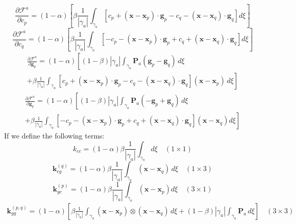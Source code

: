 \documentclass[11pt]{article} %
\begin{document}
\begin{equation}
	\frac{\partial \mathcal{F}^a}{\partial c_p} = (1-\alpha) \left[ \beta \frac{1}{| \gamma_a |} \int_{\gamma_a} \left[ c_p + (\mathbf{x} - \mathbf{x}_p) \cdot \mathbf{g}_p - c_q - (\mathbf{x} - \mathbf{x}_q) \cdot \mathbf{g}_q \right] d \xi \right]
\end{equation}
\begin{equation}
	\frac{\partial \mathcal{F}^a}{\partial c_q} = (1-\alpha) \left[ \beta \frac{1}{| \gamma_a |} \int_{\gamma_a} \left[ -c_p - (\mathbf{x} - \mathbf{x}_p) \cdot \mathbf{g}_p + c_q + (\mathbf{x} - \mathbf{x}_q) \cdot \mathbf{g}_q \right] d \xi \right]
\end{equation}
\begin{eqnarray}
	\frac{\partial \mathcal{F}^a}{\partial \mathbf{g}_p} = (1-\alpha) \left[ (1-\beta) | \gamma_a | \int_{\gamma_a} \mathbf{P}_a (\mathbf{g}_p - \mathbf{g}_q ) \, d \xi \right. \nonumber \\ + \left. \beta \frac{1}{| \gamma_a |} \int_{\gamma_a} \left[ c_p + (\mathbf{x} - \mathbf{x}_p) \cdot \mathbf{g}_p - c_q - (\mathbf{x} - \mathbf{x}_q) \cdot \mathbf{g}_q \right] (\mathbf{x} - \mathbf{x}_p) \, d \xi \right]
\end{eqnarray}
\begin{eqnarray}
	\frac{\partial \mathcal{F}^a}{\partial \mathbf{g}_q} = (1-\alpha) \left[ (1-\beta) | \gamma_a | \int_{\gamma_a} \mathbf{P}_a (- \mathbf{g}_p + \mathbf{g}_q ) \, d \xi \right. \nonumber \\ + \left. \beta \frac{1}{| \gamma_a |} \int_{\gamma_a} \left[ -c_p - (\mathbf{x} - \mathbf{x}_p) \cdot \mathbf{g}_p + c_q + (\mathbf{x} - \mathbf{x}_q) \cdot \mathbf{g}_q \right] (\mathbf{x} - \mathbf{x}_q) d \xi \right]
\end{eqnarray}
If we define the following terms:
\begin{equation}
	k_{cc} = (1-\alpha) \beta \frac{1}{| \gamma_a |} \int_{\gamma_a} d \xi \quad (1 \times 1)
\end{equation}
\begin{equation}
	\mathbf{k}_{cg}^{(q)} = (1-\alpha) \beta \frac{1}{| \gamma_a |} \int_{\gamma_a} (\mathbf{x} - \mathbf{x}_q) \, d \xi \quad (1 \times 3)
\end{equation}
\begin{equation}
	\mathbf{k}_{gc}^{(p)} = (1-\alpha) \beta \frac{1}{| \gamma_a |} \int_{\gamma_a} (\mathbf{x} - \mathbf{x}_p) d \xi \quad (3 \times 1)
\end{equation}
\begin{eqnarray}
	\mathbf{k}_{gg}^{(p,q)} = (1-\alpha) \left[ \beta \frac{1}{| \gamma_a |} \int_{\gamma_a} (\mathbf{x} - \mathbf{x}_p) \otimes (\mathbf{x} - \mathbf{x}_q) \, d \xi + (1-\beta) | \gamma_a | \int_{\gamma_a} \mathbf{P}_a \, d \xi \right] \quad (3 \times 3)
\end{eqnarray}
\end{document}
